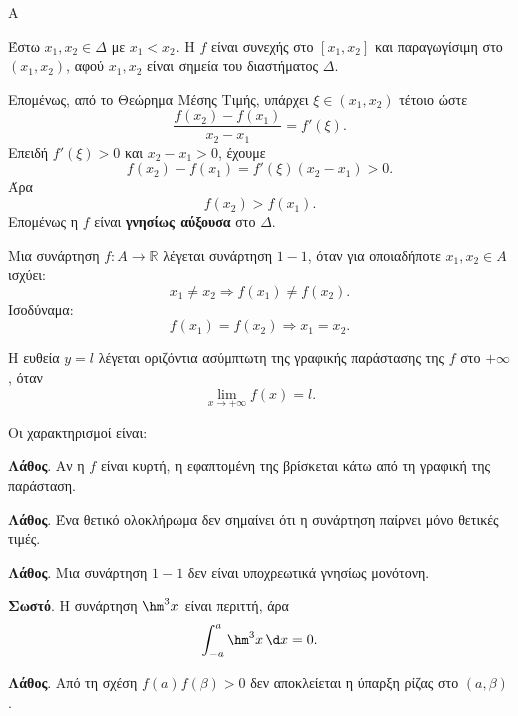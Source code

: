 \begin{thema}{Α}
\begin{erwthma}
\item Έστω $x_1,x_2\in\varDelta$ με $x_1<x_2$. Η $f$ είναι συνεχής στο $[x_1,x_2]$ και παραγωγίσιμη στο $(x_1,x_2)$, αφού $x_1,x_2$ είναι σημεία του διαστήματος $\varDelta$.

Επομένως, από το Θεώρημα Μέσης Τιμής, υπάρχει $\xi\in(x_1,x_2)$ τέτοιο ώστε
\[
\frac{f(x_2)-f(x_1)}{x_2-x_1}=f'(\xi).
\]
Επειδή $f'(\xi)>0$ και $x_2-x_1>0$, έχουμε
\[
f(x_2)-f(x_1)=f'(\xi)(x_2-x_1)>0.
\]
Άρα
\[
f(x_2)>f(x_1).
\]
Επομένως η $f$ είναι \textbf{γνησίως αύξουσα} στο $\varDelta$.

\item Μια συνάρτηση $f:A\to\mathbb{R}$ λέγεται συνάρτηση $1-1$, όταν για οποιαδήποτε $x_1,x_2\in A$ ισχύει:
\[
x_1\neq x_2 \Rightarrow f(x_1)\neq f(x_2).
\]
Ισοδύναμα:
\[
f(x_1)=f(x_2)\Rightarrow x_1=x_2.
\]

\item Η ευθεία $y=l$ λέγεται οριζόντια ασύμπτωτη της γραφικής παράστασης της $f$ στο $+\infty$, όταν
\[
\lim_{x\to+\infty}f(x)=l.
\]

\item Οι χαρακτηρισμοί είναι:
\begin{alist}
\item \textbf{Λάθος}. Αν η $f$ είναι κυρτή, η εφαπτομένη της βρίσκεται κάτω από τη γραφική της παράσταση.
\item \textbf{Λάθος}. Ένα θετικό ολοκλήρωμα δεν σημαίνει ότι η συνάρτηση παίρνει μόνο θετικές τιμές.
\item \textbf{Λάθος}. Μια συνάρτηση $1-1$ δεν είναι υποχρεωτικά γνησίως μονότονη.
\item \textbf{Σωστό}. Η συνάρτηση $\hm^3x$ είναι περιττή, άρα
\[
\dint_{-a}^{a}\hm^3x\,\d x=0.
\]
\item \textbf{Λάθος}. Από τη σχέση $f(a)f(\beta)>0$ δεν αποκλείεται η ύπαρξη ρίζας στο $(a,\beta)$.
\end{alist}
\end{erwthma}
\end{thema}

